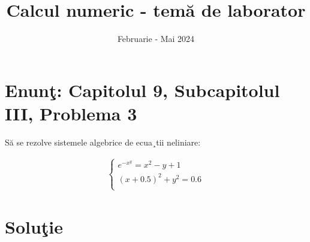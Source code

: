 \documentclass{article}
\begin{document}
\title{Calcul numeric - tem\u{a} de laborator}

\author{}

\date{Februarie - Mai 2024}

\maketitle              %








\section*{Enun\c{t}: Capitolul 9, Subcapitolul III, Problema 3}

S\u{a} se rezolve sistemele algebrice de ecua¸tii neliniare:

\begin{center}
\begin{align*}
\begin{cases}
e^{-x^y}=x^2-y+1\\
(x+0.5)^2+y^2=0.6\\
 \end{cases}
\end{align*}
\end{center}

\section*{Solu\c{t}ie}
\end{document}
